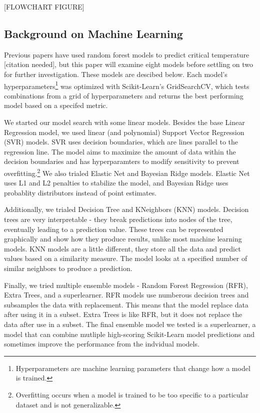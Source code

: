 \documentclass[a4paper,
               keeplastbox,   %
               ]{jacow}
\begin{document}
[FLOWCHART FIGURE]

\subsection{Background on Machine Learning}
Previous papers have used random forest models to predict critical temperature [citation needed], but this paper will examine eight models before settling on two for further investigation. These models are descibed below. Each model's hyperparameters\footnote{Hyperparameters are machine learning parameters that change how a model is trained.} was optimized with Scikit-Learn's GridSearchCV, which tests combinations from a grid of hyperparameters and returns the best performing model based on a specifed metric. 

We started our model search with some linear models. Besides the base Linear Regression model, we used linear (and polynomial) Support Vector Regression (SVR) models. SVR uses decision boundaries, which are lines parallel to the regression line. The model aims to maximize the amount of data within the decision boundaries and has hyperparamters to modify sensitivity to prevent overfitting.\footnote{Overfitting occurs when a model is trained to be too specific to a particular dataset and is not generalizable.} We also trialed Elastic Net and Bayesian Ridge models. Elastic Net uses L1 and L2 penalties to stabilize the model, and Bayesian Ridge uses probablity distributors instead of point estimates.

Additionally, we trialed Decision Tree and KNeighbors (KNN) models. Decision trees are very interpretable - they break predictions into nodes of the tree, eventually leading to a prediction value. These trees can be represented graphically and show how they produce results, unlike most machine learning models. KNN models are a little different, they store all the data and predict values based on a similarity measure. The model looks at a specified number of similar neighbors to produce a prediction.

Finally, we tried multiple ensemble models - Random Forest Regression (RFR), Extra Trees, and a superlearner. RFR models use numberous decision trees and subsamples the data with replacement. This means that the model replace data after using it in a subset. Extra Trees is like RFR, but it does not replace the data after use in a subset. The final ensemble model we tested is a superlearner, a model that can combine mutliple high-scoring Scikit-Learn model predictions and sometimes improve the performance from the indvidual models.
\end{document}
